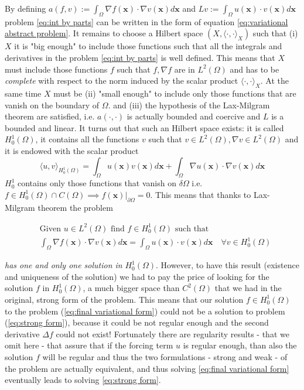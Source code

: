 By defining $a(f, v):=	\int_\Omega \nabla f(\mathbf x)\cdot\nabla v(\mathbf x) d\mathbf x $ and $Lv := \int_\Omega  u(\mathbf x)\cdot v(\mathbf x)d\mathbf x$ problem \ref{eq:int by parts} can be written in the form of equation \ref{eq:variational abstract problem}. It remains to choose a Hilbert space $(X, \langle\cdot,\cdot\rangle_X)$ such that (i) $X$ it is "big enough" to include those functions such that all the integrals and derivatives in the problem \ref{eq:int by parts} is well defined. This means that $X$ must include those functions $f$ such that $f, \nabla f$ are in $L^2(\Omega)$ and has to be \textit{complete} with respect to the norm induced by the scalar product $\langle\cdot,\cdot\rangle_X$. At the same time $X$ must be (ii) "small enough" to include only those functions that are vanish on the boundary of $\Omega$. and (iii) the hypothesis of the Lax-Milgram theorem are satisfied, i.e. $a(\cdot, \cdot)$ is actually bounded and coercive and $L$ is a bounded and linear. It turns out that such an Hilbert space exists: it is called $H^1_0(\Omega)$, it contains all the functions $v$ such that $v\in L^2(\Omega), \nabla v\in L^2(\Omega)$ and it is endowed with the scalar product 
$$
\langle u, v\rangle_{H^1_0(\Omega)} = \int_\Omega u(\mathbf x)v(\mathbf x)d\mathbf x + \int_\Omega\nabla u(\mathbf x)\cdot \nabla v(\mathbf x) d\mathbf x
$$
$H^1_0$ contains only those functions that vanish on $\delta \Omega$ i.e. $f\in H^1_0(\Omega)\cap C(\Omega) \implies \left.f(\mathbf x)\right|_{\partial\Omega}=0$. This means that thanks to Lax-Milgram theorem the problem

\begin{equation}\label{eq:final variational form}
\begin{split}
	&\text{Given }u\in L^2(\Omega)\text{ find }f\in H^1_0(\Omega)\text{ such that }\\
	&\int_\Omega \nabla f(\mathbf x)\cdot\nabla v(\mathbf x) d\mathbf x = \int_\Omega  u(\mathbf x)\cdot v(\mathbf x)d\mathbf x\quad \forall v\in H^1_0(\Omega)
\end{split}
\end{equation}

\textit{has one and only one solution in} $H^1_0(\Omega)$. However, to have this result (existence and uniqueness of the solution) we had to pay the price of looking for the solution $f$ in $H^1_0(\Omega)$, a much bigger space than  $C^2(\Omega)$ that we had in the original, strong form of the problem. This means that our solution $f\in H^1_0(\Omega)$ to the problem (\ref{eq:final variational form}) could not be a solution to problem (\ref{eq:strong form}), because it could be not regular enough and the second derivative $\Delta f$ could not exist! Fortunately there are regularity results - that we omit here - that assure that if the forcing term $u$ is regular enough, than also the solution $f$ will be regular and thus the two formulations - strong and weak - of the problem are actually equivalent, and thus solving \ref{eq:final variational form} eventually leads to solving \ref{eq:strong form}.

